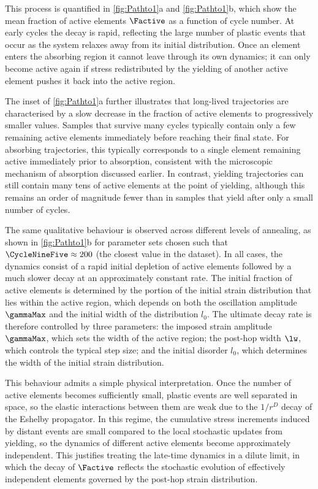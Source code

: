 \documentclass[asymmetricmargins]{library/duthesis}%
\begin{document}
This process is quantified in \cref{fig:Pathto1}a and \cref{fig:Pathto1}b, which show the mean fraction of active elements $\Factive$ as a function of cycle number. At early cycles the decay is rapid, reflecting the large number of plastic events that occur as the system relaxes away from its initial distribution. Once an element enters the absorbing region it cannot leave through its own dynamics; it can only become active again if stress redistributed by the yielding of another active element pushes it back into the active region.

The inset of \cref{fig:Pathto1}a further illustrates that long-lived trajectories are characterised by a slow decrease in the fraction of active elements to
progressively smaller values. Samples that survive many cycles typically contain only a few remaining active elements immediately before reaching their final state. For absorbing trajectories, this typically corresponds to a single element remaining active immediately prior to absorption, consistent with the microscopic mechanism of absorption discussed earlier. In contrast, yielding trajectories can still contain many tens of active elements at the point of yielding, although this remains an order of magnitude fewer than in samples that yield after only a small number of cycles.

The same qualitative behaviour is observed across different levels of annealing, as shown in \cref{fig:Pathto1}b for parameter sets chosen such that $\CycleNineFive \approx 200$ (the closest value in the dataset). In all cases, the dynamics consist of a rapid initial depletion of active elements followed by a much slower decay at an approximately constant rate. The initial fraction of active elements is determined by the portion of the initial strain distribution that lies within the active region, which depends on both the oscillation amplitude $\gammaMax$ and the initial width of the distribution $l_0$. The ultimate decay rate is therefore controlled by three parameters: the imposed strain amplitude $\gammaMax$, which sets the width of the active region; the post-hop width $\lw$, which controls the typical step size; and the initial disorder $l_0$, which determines the width of the initial strain distribution.

This behaviour admits a simple physical interpretation. Once the number of active elements becomes sufficiently small, plastic events are well separated in space, so the elastic interactions between them are weak due to the $1/r^D$ decay of the Eshelby propagator. In this regime, the cumulative stress increments induced by distant events are small compared to the local stochastic updates from yielding, so the dynamics of different active elements become approximately independent. This justifies treating the late-time dynamics in a dilute limit, in which the decay of $\Factive$ reflects the stochastic evolution of effectively independent elements governed by the post-hop strain distribution.
\end{document}
